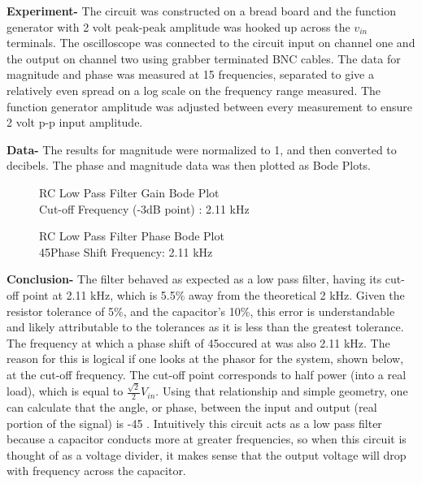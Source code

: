 \documentclass[12pt]{article}
\begin{document}
\textbf{Experiment-} The circuit was constructed on a bread board and the function generator with 2 volt peak-peak amplitude was hooked up across the $v_{in}$ terminals. The oscilloscope was connected to the circuit input on channel one and the output on channel two using grabber terminated BNC cables. The data for magnitude and phase  was measured at 15 frequencies, separated to give a relatively even spread on a log scale on the frequency range measured. The function generator amplitude was adjusted between every measurement to ensure 2 volt p-p input amplitude.\\\par

\textbf{Data-} The results for magnitude were normalized to 1, and then converted to decibels. The phase and magnitude data was then plotted as Bode Plots.
\FloatBarrier
\begin{figure}[h!]
\begin{center}
    	\resizebox{0.6\textwidth}{!}{}
\end{center}
\caption{RC Low Pass Filter Gain Bode Plot\\ Cut-off Frequency (-3dB point) : 2.11 kHz}
\end{figure}
\begin{figure}[h!]

\begin{center}
    	\resizebox{0.6\textwidth}{!}{}
\end{center}
\caption{RC Low Pass Filter Phase Bode Plot \\ 45\textdegree\space Phase Shift Frequency: 2.11 kHz}
\end{figure}
\FloatBarrier
\textbf{Conclusion-} The filter behaved as expected as a low pass filter, having its cut-off point at 2.11 kHz, which is 5.5\% away from the theoretical 2 kHz. Given the resistor tolerance of 5\%, and the capacitor's 10\%, this error is understandable and likely attributable to the tolerances as it is less than the greatest tolerance. The frequency at which a phase shift of 45\textdegree\space occured at was also 2.11 kHz. The reason for this is logical if one looks at the phasor for the system, shown below, at the cut-off frequency. The cut-off point corresponds to half power (into a real load), which is equal to $\frac{\sqrt{2}}{2}V_{in}$. Using that relationship and simple geometry, one can calculate that the angle, or phase, between the input and output (real portion of the signal) is -45 \textdegree. Intuitively this circuit acts as a low pass filter because a capacitor conducts  more at greater frequencies, so when this circuit is thought of as a voltage divider, it makes sense that the output voltage will drop with frequency across the capacitor.
\end{document}
